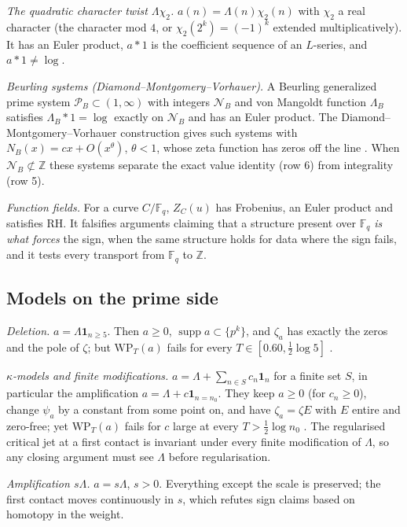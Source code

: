 \documentclass[11pt]{amsart}
\theoremstyle{definition}
\theoremstyle{remark}
\newcommand{\Z}{\mathbb Z}
\newcommand{\supp}{\operatorname{supp}}
\begin{document}
\emph{The quadratic character twist $\Lambda\chi_2$.} $a(n)=\Lambda(n)\chi_2(n)$ with $\chi_2$ a real
character (the character mod $4$, or $\chi_2(2^k)=(-1)^k$ extended multiplicatively). It has an Euler
product, $a*1$ is the coefficient sequence of an $L$-series, and $a*1\ne\log$.

\emph{Beurling systems (Diamond--Montgomery--Vorhauer).} A Beurling generalized prime system $\mathcal
P_B\subset(1,\infty)$ with integers $\mathcal N_B$ and von Mangoldt function $\Lambda_B$ satisfies
$\Lambda_B*1=\log$ exactly on $\mathcal N_B$ and has an Euler product. The Diamond--Montgomery--Vorhauer
construction gives such systems with $N_B(x)=cx+O(x^\theta)$, $\theta<1$, whose zeta function has zeros
off the line \cite{DMV2006}. When $\mathcal N_B\not\subset\Z$ these systems separate the exact value
identity (row 6) from integrality (row 5).

\emph{Function fields.} For a curve $C/\mathbb F_q$, $Z_C(u)$ has Frobenius, an Euler product and satisfies
RH. It falsifies arguments claiming that a structure present over $\mathbb F_q$ \emph{is what forces} the
sign, when the same structure holds for data where the sign fails, and it tests every transport from
$\mathbb F_q$ to $\Z$.

\subsection{Models on the prime side}\label{subsec:primeside}
\emph{Deletion.} $a=\Lambda\mathbf 1_{n\ge5}$. Then $a\ge0$, $\supp a\subset\{p^k\}$, and $\zeta_a$ has exactly the
zeros and the pole of $\zeta$; but $\mathrm{WP}_T(a)$ fails for every $T\in[0.60,\frac12\log5]$
\cite[Thm.~12.5(i)]{Paper47}.

\emph{$\kappa$-models and finite modifications.} $a=\Lambda+\sum_{n\in S}c_n\mathbf 1_{n}$ for a finite set $S$,
in particular the amplification $a=\Lambda+c\mathbf1_{n=n_0}$. They keep $a\ge0$ (for $c_n\ge0$), change
$\psi_a$ by a constant from some point on, and have $\zeta_a=\zeta E$ with $E$ entire and zero-free; yet
$\mathrm{WP}_T(a)$ fails for $c$ large at every $T>\frac12\log n_0$
\cite[Thm.~12.5(ii)]{Paper47}. The regularised critical jet at a first contact is invariant
under every finite modification of $\Lambda$, so any closing argument must see $\Lambda$ before
regularisation.

\emph{Amplification $s\Lambda$.} $a=s\Lambda$, $s>0$. Everything except the scale is preserved; the first
contact moves continuously in $s$, which refutes sign claims based on homotopy in the weight.
\end{document}
